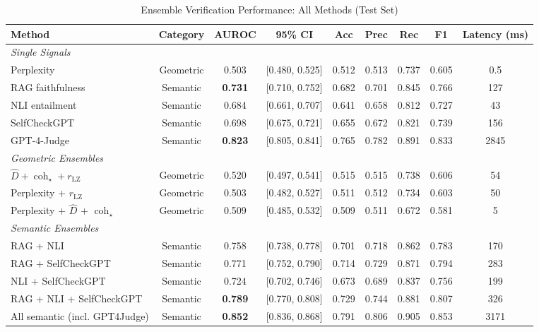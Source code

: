 \documentclass[11pt]{article}
\begin{document}
\begin{table}[h]
\centering
\caption{Ensemble Verification Performance: All Methods (Test Set)}
\label{tab:performance_full}
\tiny
\begin{tabular}{lcccccccc}
\toprule
\textbf{Method} & \textbf{Category} & \textbf{AUROC} & \textbf{95\% CI} & \textbf{Acc} & \textbf{Prec} & \textbf{Rec} & \textbf{F1} & \textbf{Latency (ms)} \\
\midrule
\multicolumn{9}{l}{\textit{Single Signals}} \\
Perplexity & Geometric & 0.503 & [0.480, 0.525] & 0.512 & 0.513 & 0.737 & 0.605 & 0.5 \\
RAG faithfulness & Semantic & \textbf{0.731} & [0.710, 0.752] & 0.682 & 0.701 & 0.845 & 0.766 & 127 \\
NLI entailment & Semantic & 0.684 & [0.661, 0.707] & 0.641 & 0.658 & 0.812 & 0.727 & 43 \\
SelfCheckGPT & Semantic & 0.698 & [0.675, 0.721] & 0.655 & 0.672 & 0.821 & 0.739 & 156 \\
GPT-4-Judge & Semantic & \textbf{0.823} & [0.805, 0.841] & 0.765 & 0.782 & 0.891 & 0.833 & 2845 \\
\midrule
\multicolumn{9}{l}{\textit{Geometric Ensembles}} \\
$\hat{D} + \operatorname{coh}_\star + r_{\text{LZ}}$ & Geometric & 0.520 & [0.497, 0.541] & 0.515 & 0.515 & 0.738 & 0.606 & 54 \\
Perplexity + $r_{\text{LZ}}$ & Geometric & 0.503 & [0.482, 0.527] & 0.511 & 0.512 & 0.734 & 0.603 & 50 \\
Perplexity + $\hat{D}$ + $\operatorname{coh}_\star$ & Geometric & 0.509 & [0.485, 0.532] & 0.509 & 0.511 & 0.672 & 0.581 & 5 \\
\midrule
\multicolumn{9}{l}{\textit{Semantic Ensembles}} \\
RAG + NLI & Semantic & 0.758 & [0.738, 0.778] & 0.701 & 0.718 & 0.862 & 0.783 & 170 \\
RAG + SelfCheckGPT & Semantic & 0.771 & [0.752, 0.790] & 0.714 & 0.729 & 0.871 & 0.794 & 283 \\
NLI + SelfCheckGPT & Semantic & 0.724 & [0.702, 0.746] & 0.673 & 0.689 & 0.837 & 0.756 & 199 \\
RAG + NLI + SelfCheckGPT & Semantic & \textbf{0.789} & [0.770, 0.808] & 0.729 & 0.744 & 0.881 & 0.807 & 326 \\
All semantic (incl. GPT4Judge) & Semantic & \textbf{0.852} & [0.836, 0.868] & 0.791 & 0.806 & 0.905 & 0.853 & 3171 \\

\end{tabular}
\end{table}
\end{document}
